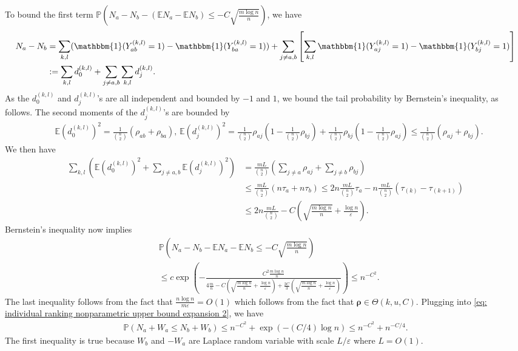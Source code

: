 \documentclass[letterpaper,12pt]{article}
\numberwithin{equation}{section}
\theoremstyle{plain}
\numberwithin{Theorem}{section}
\numberwithin{corollary}{section}
\numberwithin{proposition}{section}
\numberwithin{Lemma}{section}
{
	\theoremstyle{definition}
	\newtheorem{Definition}{Definition}
	\newtheorem{example}{Example}
	\numberwithin{example}{section}
	\newtheorem{fact}{Fact}
	\numberwithin{fact}{section}
	\newtheorem{remark}{Remark}
}
\newcommand{\Pro}{\mathbb{P}}
\newcommand{\1}{\mathbbm{1}}
\def\E{\mathbb{E}}
\begin{document}
To bound the first term $\Pro(N_a - N_b - (\E N_a - \E N_b) \leq -C\sqrt{\frac{m \log n}{n}})$, we have
\begin{align*}
	N_a - N_b &= \sum_{k,l} (\1(Y^{(k,l)}_{ab} = 1) - \1(Y^{(k,l)}_{ba} = 1)) + \sum_{j \neq a, b}\left[\sum_{k,l} \1(Y^{(k,l)}_{aj} = 1) - \1(Y^{(k,l)}_{bj} = 1)\right] \\
	&:= \sum_{k,l}d^{(k,l)}_0 + \sum_{j \neq a, b}\sum_{k,l} d^{(k,l)}_j.
\end{align*}
As the $d^{(k,l)}_0$ and $d^{(k,l)}_j$'s are all independent and bounded by $-1$ and $1$, we bound the tail probability by Bernstein's inequality, as follows. The second moments of the $d^{(k,l)}_j$'s are bounded by
\begin{align*}
	&\E(d^{(k,l)}_0)^2 = \frac{1}{{n \choose 2}}(\rho_{ab} + \rho_{ba}), \, \E (d^{(k,l)}_j)^2 = \frac{1}{{n \choose 2}}\rho_{aj}\left(1-\frac{1}{{n \choose 2}}\rho_{bj}\right) + \frac{1}{{n \choose 2}}\rho_{bj}\left(1-\frac{1}{{n \choose 2}}\rho_{aj}\right) \leq\frac{1}{{n \choose 2}}(\rho_{aj} + \rho_{bj}).
\end{align*}
We then have
\begin{align*}
	\sum_{k,l}\left(\E (d^{(k,l)}_0)^2 + \sum_{j \neq a, b} \E (d^{(k,l)}_j)^2\right) &= \frac{mL}{{n \choose 2}} \left(\sum_{j \neq a} \rho_{aj} + \sum_{j \neq b} \rho_{bj}\right)\\
	&\leq  \frac{mL}{{n \choose 2}} (n\tau_a + n\tau_b) \leq 2n \frac{mL}{{n \choose 2}} \tau_a - n \frac{mL}{{n \choose 2}} (\tau_{(k)} - \tau_{(k+1)})\\
	&\leq 2n \frac{mL}{{n \choose 2}}  - C\left(\sqrt{\frac{m\log n}{n}} + \frac{\log n}{\varepsilon}\right).
\end{align*}
Bernstein's inequality now implies
\begin{align*}
	&\Pro\left(N_a - N_b - \E N_a - \E N_b \leq -C\sqrt{\frac{m\log n}{n}}\right) \\
	&\leq c\exp\left(-\frac{C^2\frac{m\log n}{n}}{4\frac{m}{n} - C\left(\sqrt{\frac{m\log n}{n}} + \frac{\log n}{\varepsilon}\right) + \frac{2C}{3}\left(\sqrt{\frac{m\log n}{n}} + \frac{\log n}{\varepsilon}\right)}\right) \leq n^{-C^2}.
\end{align*}
The last inequality follows from the fact that $\frac{n \log n}{m\varepsilon} =O(1)$ which follows from the fact that $\bm \rho \in \Theta(k, u, C)$.
Plugging into \eqref{eq: individual ranking nonparametric upper bound expansion 2}, we have
\begin{align*}
	\Pro(N_a + W_a \leq N_b + W_b) \leq n^{-C^2} + \exp\left(-(C/4)\log n\right) \leq n^{-C^2} + n^{-C/4}.
\end{align*}
The first inequality is true because $W_b$ and $-W_a$ are Laplace random variable with scale $L/\varepsilon$ where $L = O(1)$. 
\end{document}
